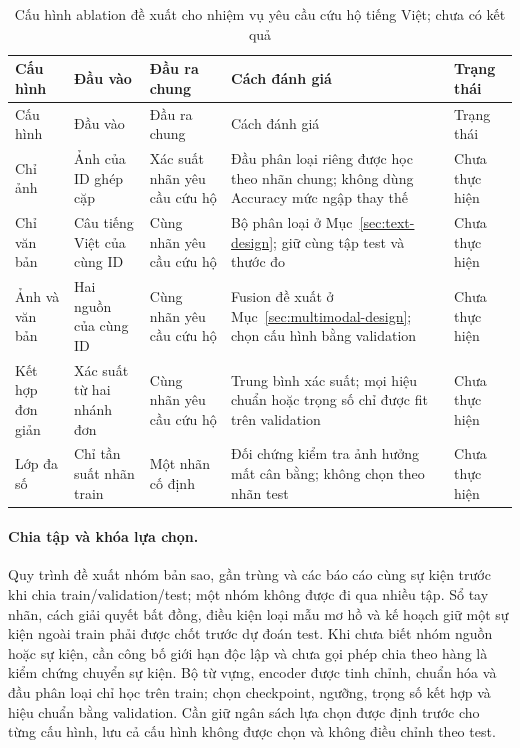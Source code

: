 \begin{longtable}{P{.13\textwidth}P{.16\textwidth}P{.19\textwidth}P{.25\textwidth}P{.12\textwidth}}
\caption{Cấu hình ablation đề xuất cho nhiệm vụ yêu cầu cứu hộ tiếng Việt; chưa có kết quả}\label{tab:vi-ablation-plan}\\
\toprule Cấu hình & Đầu vào & Đầu ra chung & Cách đánh giá & Trạng thái \\\midrule\endfirsthead
\toprule Cấu hình & Đầu vào & Đầu ra chung & Cách đánh giá & Trạng thái \\\midrule\endhead
Chỉ ảnh & Ảnh của ID ghép cặp & Xác suất nhãn yêu cầu cứu hộ & Đầu phân loại riêng được học theo nhãn chung; không dùng Accuracy mức ngập thay thế & Chưa thực hiện \\
Chỉ văn bản & Câu tiếng Việt của cùng ID & Cùng nhãn yêu cầu cứu hộ & Bộ phân loại ở Mục~\ref{sec:text-design}; giữ cùng tập test và thước đo & Chưa thực hiện \\
Ảnh và văn bản & Hai nguồn của cùng ID & Cùng nhãn yêu cầu cứu hộ & Fusion đề xuất ở Mục~\ref{sec:multimodal-design}; chọn cấu hình bằng validation & Chưa thực hiện \\
Kết hợp đơn giản & Xác suất từ hai nhánh đơn & Cùng nhãn yêu cầu cứu hộ & Trung bình xác suất; mọi hiệu chuẩn hoặc trọng số chỉ được fit trên validation & Chưa thực hiện \\
Lớp đa số & Chỉ tần suất nhãn train & Một nhãn cố định & Đối chứng kiểm tra ảnh hưởng mất cân bằng; không chọn theo nhãn test & Chưa thực hiện \\
\bottomrule
\end{longtable}

\paragraph{Chia tập và khóa lựa chọn.} Quy trình đề xuất nhóm bản sao, gần trùng và các báo cáo cùng sự kiện trước khi chia train/validation/test; một nhóm không được đi qua nhiều tập. Sổ tay nhãn, cách giải quyết bất đồng, điều kiện loại mẫu mơ hồ và kế hoạch giữ một sự kiện ngoài train phải được chốt trước dự đoán test. Khi chưa biết nhóm nguồn hoặc sự kiện, cần công bố giới hạn độc lập và chưa gọi phép chia theo hàng là kiểm chứng chuyển sự kiện. Bộ từ vựng, encoder được tinh chỉnh, chuẩn hóa và đầu phân loại chỉ học trên train; chọn checkpoint, ngưỡng, trọng số kết hợp và hiệu chuẩn bằng validation. Cần giữ ngân sách lựa chọn được định trước cho từng cấu hình, lưu cả cấu hình không được chọn và không điều chỉnh theo test.

